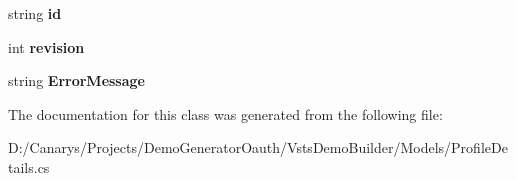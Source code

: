 \begin{DoxyCompactItemize}
\item 
\mbox{\label{class_vsts_demo_builder_1_1_models_1_1_profile_details_ad14d0dff00d36cafddf37c5cd2ff40f3}} 
string {\bfseries id}
\item 
\mbox{\label{class_vsts_demo_builder_1_1_models_1_1_profile_details_a9e0a0256996b79722bdd8b40c66c0f3e}} 
int {\bfseries revision}
\item 
\mbox{\label{class_vsts_demo_builder_1_1_models_1_1_profile_details_ae5ab4728c36b94b7ece9e073f630b54c}} 
string {\bfseries Error\+Message}
\end{DoxyCompactItemize}


The documentation for this class was generated from the following file\+:\begin{DoxyCompactItemize}
\item 
D\+:/\+Canarys/\+Projects/\+Demo\+Generator\+Oauth/\+Vsts\+Demo\+Builder/\+Models/Profile\+Details.\+cs\end{DoxyCompactItemize}

